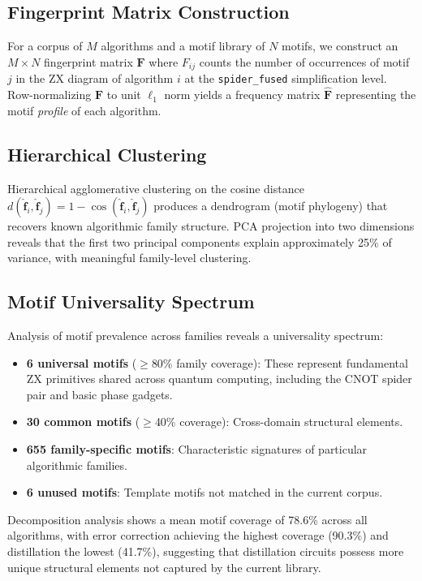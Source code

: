 \documentclass[twocolumn,prl,amsmath,amssymb,superscriptaddress]{revtex4-2}
\begin{document}
\subsection{Fingerprint Matrix Construction}

For a corpus of $M$ algorithms and a motif library of $N$ motifs, we construct an $M \times N$ fingerprint matrix $\mathbf{F}$ where $F_{ij}$ counts the number of occurrences of motif $j$ in the ZX diagram of algorithm $i$ at the \texttt{spider\_fused} simplification level.
Row-normalizing $\mathbf{F}$ to unit $\ell_1$ norm yields a frequency matrix $\hat{\mathbf{F}}$ representing the motif \emph{profile} of each algorithm.

\subsection{Hierarchical Clustering}

Hierarchical agglomerative clustering on the cosine distance $d(\hat{\mathbf{f}}_i, \hat{\mathbf{f}}_j) = 1 - \cos(\hat{\mathbf{f}}_i, \hat{\mathbf{f}}_j)$ produces a dendrogram (motif phylogeny) that recovers known algorithmic family structure.
PCA projection into two dimensions reveals that the first two principal components explain approximately 25\% of variance, with meaningful family-level clustering.

\subsection{Motif Universality Spectrum}

Analysis of motif prevalence across families reveals a universality spectrum:
\begin{itemize}
    \item \textbf{6 universal motifs} ($\geq$80\% family coverage): These represent fundamental ZX primitives shared across quantum computing, including the CNOT spider pair and basic phase gadgets.
    \item \textbf{30 common motifs} ($\geq$40\% coverage): Cross-domain structural elements.
    \item \textbf{655 family-specific motifs}: Characteristic signatures of particular algorithmic families.
    \item \textbf{6 unused motifs}: Template motifs not matched in the current corpus.
\end{itemize}

Decomposition analysis shows a mean motif coverage of 78.6\% across all algorithms, with error correction achieving the highest coverage (90.3\%) and distillation the lowest (41.7\%), suggesting that distillation circuits possess more unique structural elements not captured by the current library.
\end{document}

